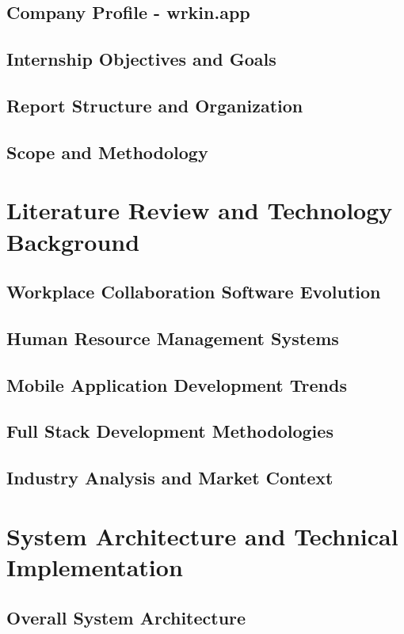 \documentclass[a4paper, 11pt, oneside]{report}
\begin{document}
\section{Company Profile - wrkin.app}
\section{Internship Objectives and Goals}
\section{Report Structure and Organization}
\section{Scope and Methodology}


\chapter{Literature Review and Technology Background}
\section{Workplace Collaboration Software Evolution}
\section{Human Resource Management Systems}
\section{Mobile Application Development Trends}
\section{Full Stack Development Methodologies}
\section{Industry Analysis and Market Context}


\chapter{System Architecture and Technical Implementation}
\section{Overall System Architecture}
\end{document}
